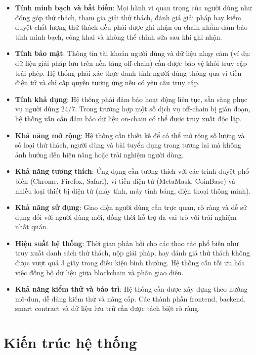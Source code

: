 \begin{itemize}
  \item \textbf{Tính minh bạch và bất biến}: Mọi hành vi quan trọng của người dùng như đóng góp thử thách, tham gia giải thử thách, đánh giá giải pháp hay kiểm duyệt chất lượng thử thách đều phải được ghi nhận on-chain nhằm đảm bảo tính minh bạch, công khai và không thể chỉnh sửa sau khi ghi nhận.
  \item \textbf{Tính bảo mật}: Thông tin tài khoản người dùng và dữ liệu nhạy cảm (ví dụ: dữ liệu giải pháp lưu trên nền tảng off-chain) cần được bảo vệ khỏi truy cập trái phép. Hệ thống phải xác thực danh tính người dùng thông qua ví tiền điện tử và chỉ cấp quyền tương ứng nếu có yêu cầu truy cập.
  \item \textbf{Tính khả dụng}: Hệ thống phải đảm bảo hoạt động liên tục, sẵn sàng phục vụ người dùng 24/7. Trong trường hợp một số dịch vụ off-chain bị gián đoạn, hệ thống vẫn cần đảm bảo dữ liệu on-chain có thể được truy xuất độc lập.
  \item \textbf{Khả năng mở rộng}: Hệ thống cần thiết kế để có thể mở rộng số lượng và số loại thử thách, người dùng và bài tuyển dụng trong tương lai mà không ảnh hưởng đến hiệu năng hoặc trải nghiệm người dùng.
  \item \textbf{Khả năng tương thích}: Ứng dụng cần tương thích với các trình duyệt phổ biến (Chrome, Firefox, Safari), ví tiền điện tử (MetaMask, CoinBase) và nhiều loại thiết bị điện tử (máy tính, máy tính bảng, điện thoại thông minh).
  \item \textbf{Khả năng sử dụng}: Giao diện người dùng cần trực quan, rõ ràng và dễ sử dụng đối với người dùng mới, đồng thời hỗ trợ đa vai trò với trải nghiệm nhất quán.
  \item \textbf{Hiệu suất hệ thống}: Thời gian phản hồi cho các thao tác phổ biến như truy xuất danh sách thử thách, nộp giải pháp, hay đánh giá thử thách không được vượt quá 3 giây trong điều kiện bình thường. Hệ thống cần tối ưu hóa việc đồng bộ dữ liệu giữa blockchain và phần giao diện.
  \item \textbf{Khả năng kiểm thử và bảo trì}: Hệ thống cần được xây dựng theo hướng mô-đun, dễ dàng kiểm thử và nâng cấp. Các thành phần frontend, backend, smart contract và dữ liệu lưu trữ cần được tách biệt rõ ràng.
\end{itemize}

\section{Kiến trúc hệ thống}

